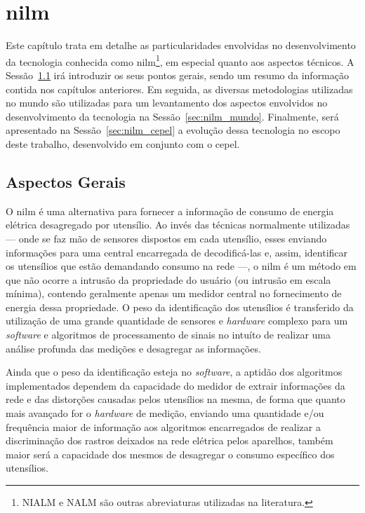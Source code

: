 \chapter[Monitoração Não-Invasiva de Cargas Elétricas]{\acrfull{nilm}}
\label{cap:nilm}

Este capítulo trata em detalhe as particularidades envolvidas no
desenvolvimento da tecnologia conhecida como
\gls{nilm}\footnote{NIALM e NALM são outras abreviaturas utilizadas na
literatura.}, em especial quanto aos aspectos técnicos. A
Sessão~\ref{sec:nilm_aspec_gerais} irá introduzir os seus pontos
gerais, sendo um resumo da informação contida nos capítulos
anteriores. Em seguida, as diversas metodologias utilizadas no mundo
são utilizadas para um levantamento dos aspectos envolvidos no
desenvolvimento da tecnologia na Sessão~\ref{sec:nilm_mundo}.
Finalmente, será apresentado na Sessão~\ref{sec:nilm_cepel} a evolução
dessa tecnologia no escopo deste trabalho, desenvolvido em conjunto
com o \gls{cepel}.

\section{Aspectos Gerais}
\label{sec:nilm_aspec_gerais}

O \gls{nilm} é uma alternativa para fornecer a informação de consumo
de energia elétrica desagregado por utensílio. Ao invés das técnicas
normalmente utilizadas --- onde se faz mão de sensores dispostos em cada
utensílio, esses enviando informações para uma central encarregada de
decodificá-las e, assim, identificar os utensílios que estão demandando
consumo na rede ---, o \gls{nilm} é um método em que não ocorre a intrusão
da propriedade do usuário (ou intrusão em escala mínima), contendo
geralmente apenas um medidor central no fornecimento de energia dessa
propriedade. O peso da identificação dos utensílios é transferido da
utilização de uma grande quantidade de sensores e \emph{hardware}
complexo para um \emph{software} e algoritmos de processamento de
sinais no intuíto de realizar uma análise profunda das medições e
desagregar as informações.

Ainda que o peso da identificação esteja no \emph{software}, a
aptidão dos algoritmos implementados dependem da capacidade do
medidor de extrair informações da rede e das distorções causadas pelos
utensílios na mesma, de forma que quanto mais avançado for o
\emph{hardware} de medição, enviando uma quantidade e/ou frequência
maior de informação aos algoritmos encarregados de realizar a
discriminação dos rastros deixados na rede elétrica pelos aparelhos,
também maior será a capacidade dos mesmos de desagregar o consumo
específico dos utensílios.

